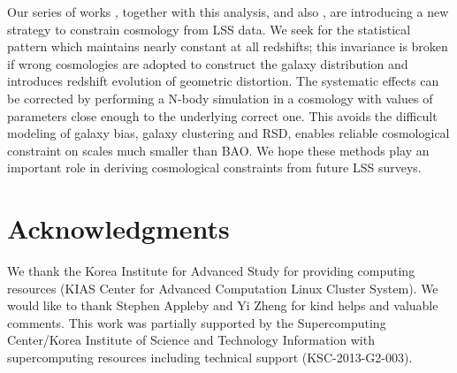 \documentclass[iop]{emulateapj}
\begin{document}
Our series of works \cite{Li2014,Li2015,Li2016}, together with this analysis, 
and also \citep{topology,MS2016},
are introducing a new strategy to constrain cosmology from LSS data.
We seek for the statistical pattern which maintains nearly constant at all redshifts;
this invariance is broken if wrong cosmologies are adopted to construct the galaxy distribution
and introduces redshift evolution of geometric distortion.
The systematic effects can be corrected by performing a N-body simulation 
in a cosmology with values of parameters close enough to the underlying correct one.
This avoids the difficult modeling of galaxy bias, galaxy clustering and RSD,
enables reliable cosmological constraint on scales much smaller than BAO.
We hope these methods play an important role in deriving cosmological constraints from future LSS surveys.

 
 
\section*{Acknowledgments}

We thank the Korea Institute for Advanced Study for providing computing resources (KIAS Center for Advanced Computation Linux Cluster System).
We would like to thank Stephen Appleby and Yi Zheng for kind helps and valuable comments.
This work was partially supported by the
Supercomputing Center/Korea Institute of Science and
Technology Information with supercomputing resources
including technical support (KSC-2013-G2-003).

\appendix

\
\end{document}
